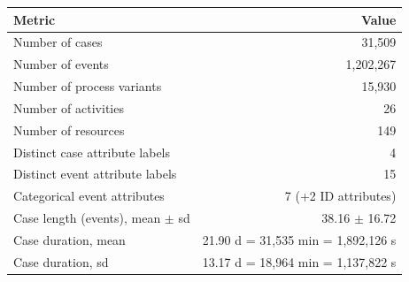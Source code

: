 \begin{tabular}{lr}
\toprule
Metric & Value \\
\midrule
Number of cases & 31,509 \\
Number of events & 1,202,267 \\
Number of process variants & 15,930 \\
Number of activities & 26 \\
Number of resources & 149 \\
Distinct case attribute labels & 4 \\
Distinct event attribute labels & 15 \\
Categorical event attributes & 7 (+2 ID attributes) \\
Case length (events), mean $\pm$ sd & 38.16 $\pm$ 16.72 \\
Case duration, mean & 21.90 d = 31,535 min = 1,892,126 s \\
Case duration, sd & 13.17 d = 18,964 min = 1,137,822 s \\
\bottomrule
\end{tabular}
